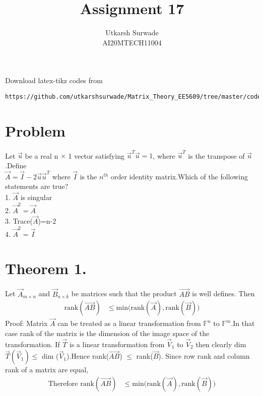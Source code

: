 \documentclass[journal,12pt]{IEEEtran}
\begin{document}
\def\putbox#1#2#3{\makebox[0in][l]{\makebox[#1][l]{}\raisebox{\baselineskip}[0in][0in]{\raisebox{#2}[0in][0in]{#3}}}}
     \def\rightbox#1{\makebox[0in][r]{#1}}
     \def\centbox#1{\makebox[0in]{#1}}
     \def\topbox#1{\raisebox{-\baselineskip}[0in][0in]{#1}}
     \def\midbox#1{\raisebox{-0.5\baselineskip}[0in][0in]{#1}}
\vspace{3cm}
\title{Assignment 17}
\author{Utkarsh Surwade\\AI20MTECH11004}
\maketitle
\bigskip
\renewcommand{\thefigure}{\theenumi}
\renewcommand{\thetable}{\theenumi}
Download latex-tikz codes from 
%
\begin{lstlisting}
https://github.com/utkarshsurwade/Matrix_Theory_EE5609/tree/master/codes
\end{lstlisting}
%
 
\section{\textbf{Problem}}
Let $\vec{u}$ be a real n $\times$ 1 vector satisfying $\vec{u}^T\vec{u}=1$, where $\vec{u}^T$ is the transpose of $\vec{u}$.Define\\
$\vec{A}=\vec{I}-2\vec{u}\vec{u}^T$ where $\vec{I}$ is the $n^{th}$ order identity matrix.Which of the following statements are true?\\
1. $\vec{A}$ is singular\\
2. $\vec{A}^2=\vec{A}$\\
3. Trace($\vec{A}$)=n-2\\
4. $\vec{A}^2=\vec{I}$\\

\section{\textbf{Theorem 1.}}
Let $\vec{A}_{m \times n}$ and $\vec{B}_{n \times k}$ be matrices such that the product $\vec{AB}$ is well defines. Then\\
\begin{align}
    \mbox{rank}(\vec{AB})&\leq\mbox{min(rank}(\vec{A}),\mbox{rank}(\vec{B}))
\end{align}
Proof: Matrix $\vec{A}$ can be treated  as a linear transformation from $\mathbb{F}^n$ to $\mathbb{F}^m$.In that case rank of the matrix is the dimension of the image space of the transformation. If $\vec{T}$ is a linear
transformation from $\vec{V}_1$ to $\vec{V}_2$ then clearly dim $\vec{T}(\vec{V}_1)\leq$ dim ($\vec{V}_1$).Hence rank($\vec{AB}$) $\leq$ rank($\vec{B}$). Since row rank and column rank of a matrix are equal,
\begin{align}
    \mbox{Therefore rank}(\vec{AB})&\leq\mbox{min(rank}(\vec{A}),\mbox{rank}(\vec{B}))\label{eq:rank_of_AB}
\end{align}
\end{document}
